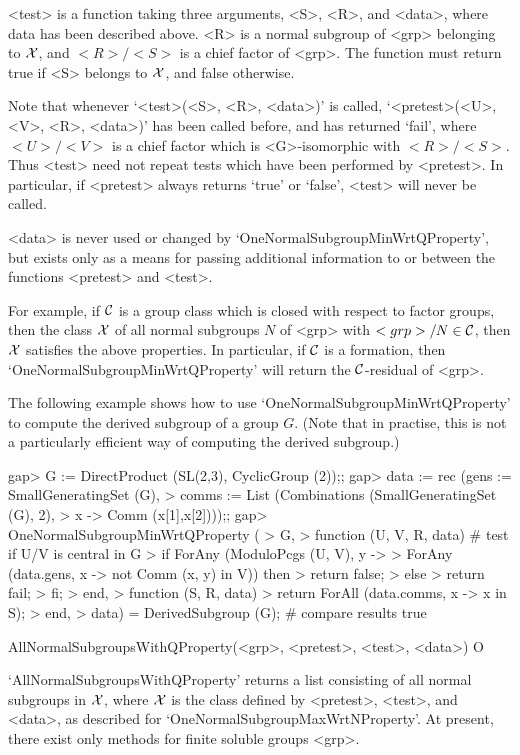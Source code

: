 <test> is a function taking three arguments, <S>, <R>, and <data>, where
data has been described above. <R> is a normal subgroup of <grp> belonging to
$\cal X$, and $<R>/<S>$ is a chief factor of <grp>. The function must return
true if <S> belongs to $\cal X$, and false otherwise. 

Note that whenever `<test>(<S>, <R>, <data>)' is called, 
`<pretest>(<U>, <V>, <R>, <data>)' has been called before, and has returned
`fail', where  $<U>/<V>$ is a  chief factor which is <G>-isomorphic with
$<R>/<S>$. Thus <test> need not repeat tests which have been performed by
<pretest>. In particular, if <pretest> always returns `true' or `false',
<test> will never be called.

<data> is never used or changed by `OneNormalSubgroupMinWrtQProperty', but
exists only as a means for passing additional information to or between
the functions <pretest> and <test>.

For example, if $\cal C$ is a group class which is closed with respect to
factor groups, then the class $\cal X$ of all normal subgroups $N$ of <grp>
with $<grp>/N \in \cal C$, then $\cal X$ satisfies the above properties. In
particular, if $\cal C$ is a formation, then
`OneNormalSubgroupMinWrtQProperty' will return the $\cal C$-residual of
<grp>.

The following example shows how to use `OneNormalSubgroupMinWrtQProperty' to
compute the derived subgroup of a group $G$. (Note that in practise, this 
is not a particularly efficient way of computing the derived subgroup.)

\beginexample
gap> G := DirectProduct (SL(2,3), CyclicGroup (2));;
gap> data := rec (gens := SmallGeneratingSet (G),
>    comms := List (Combinations (SmallGeneratingSet (G), 2), 
>       x -> Comm (x[1],x[2])));;
gap> OneNormalSubgroupMinWrtQProperty (
>    G,
>    function (U, V, R, data) # test if U/V is central in G
>        if ForAny (ModuloPcgs (U, V), y ->
>           ForAny (data.gens, x -> not Comm (x, y) in V)) then 
>           return false;
>        else
>           return fail;
>        fi;
>     end,
>     function (S, R, data)
>        return ForAll (data.comms, x -> x in S);
>     end,
>     data) = DerivedSubgroup (G); # compare results
true
\endexample       

\>AllNormalSubgroupsWithQProperty(<grp>, <pretest>, <test>, <data>) O

`AllNormalSubgroupsWithQProperty' returns a list consisting of all normal
subgroups in $\cal X$, where $\cal X$ is the class defined by <pretest>,
<test>, and <data>, as described for `OneNormalSubgroupMaxWrtNProperty'. 
At present, there exist only methods for finite soluble groups <grp>.

